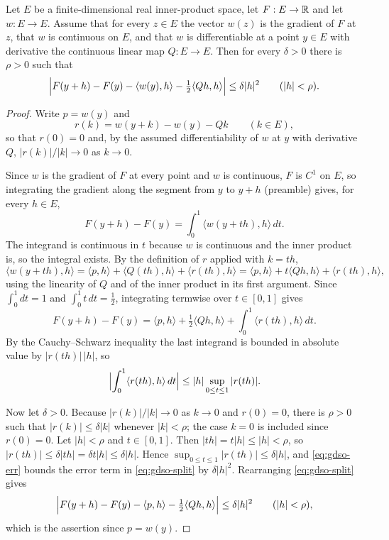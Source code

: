 \begin{lemma}
Let $E$ be a finite-dimensional real inner-product space, let $F:E\to\mathbb{R}$ and let
$w:E\to E$. Assume that for every $z\in E$ the vector $w(z)$ is the gradient of
$F$ at $z$, that $w$ is continuous on $E$, and that $w$ is differentiable at a
point $y\in E$ with derivative the continuous linear map $Q:E\to E$. Then for
every $\delta>0$ there is $\rho>0$ such that
\[
  \Bigl|F(y+h)-F(y)-\langle w(y),h\rangle-\tfrac12\langle Qh,h\rangle\Bigr|
    \le\delta|h|^2\qquad(|h|<\rho).
\]
\end{lemma}
\begin{proof}
Write $p=w(y)$ and
\[
  r(k)=w(y+k)-w(y)-Qk\qquad(k\in E),
\]
so that $r(0)=0$ and, by the assumed differentiability of $w$ at $y$ with
derivative $Q$, $|r(k)|/|k|\to0$ as $k\to0$.

Since $w$ is the gradient of $F$ at every point and $w$ is continuous, $F$ is
$C^1$ on $E$, so integrating the gradient along the segment from $y$ to $y+h$
(preamble) gives, for every $h\in E$,
\[
  F(y+h)-F(y)=\int_0^1\langle w(y+th),h\rangle\,dt .
\]
The integrand is continuous in $t$ because $w$ is continuous and the inner
product is, so the integral exists. By the definition of $r$ applied with
$k=th$,
\[
  \langle w(y+th),h\rangle
   =\langle p,h\rangle+\langle Q(th),h\rangle+\langle r(th),h\rangle
   =\langle p,h\rangle+t\langle Qh,h\rangle+\langle r(th),h\rangle,
\]
using the linearity of $Q$ and of the inner product in its first argument. Since
$\int_0^1dt=1$ and $\int_0^1t\,dt=\tfrac12$, integrating termwise over
$t\in[0,1]$ gives
\begin{equation}\label{eq:gdso-split}
  F(y+h)-F(y)
   =\langle p,h\rangle+\tfrac12\langle Qh,h\rangle
     +\int_0^1\langle r(th),h\rangle\,dt .
\end{equation}
By the Cauchy--Schwarz inequality the last integrand is bounded in absolute
value by $|r(th)|\,|h|$, so
\begin{equation}\label{eq:gdso-err}
  \Bigl|\int_0^1\langle r(th),h\rangle\,dt\Bigr|
   \le|h|\sup_{0\le t\le1}|r(th)| .
\end{equation}

Now let $\delta>0$. Because $|r(k)|/|k|\to0$ as $k\to0$ and $r(0)=0$, there is
$\rho>0$ such that $|r(k)|\le\delta|k|$ whenever $|k|<\rho$; the case $k=0$ is
included since $r(0)=0$. Let $|h|<\rho$ and $t\in[0,1]$. Then
$|th|=t|h|\le|h|<\rho$, so $|r(th)|\le\delta|th|=\delta t|h|\le\delta|h|$.
Hence $\sup_{0\le t\le1}|r(th)|\le\delta|h|$, and \eqref{eq:gdso-err} bounds the
error term in \eqref{eq:gdso-split} by $\delta|h|^2$. Rearranging
\eqref{eq:gdso-split} gives
\[
  \Bigl|F(y+h)-F(y)-\langle p,h\rangle-\tfrac12\langle Qh,h\rangle\Bigr|
   \le\delta|h|^2\qquad(|h|<\rho),
\]
which is the assertion since $p=w(y)$.
\end{proof}
